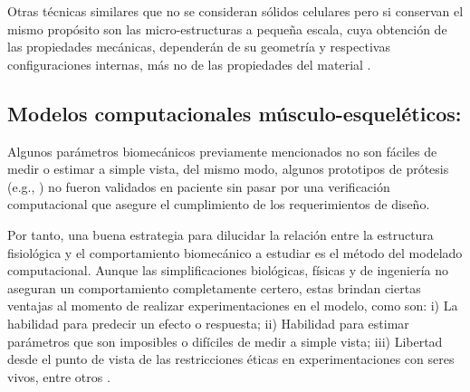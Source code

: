 \documentclass[12pt,english]{article}
\begin{document}
Otras técnicas similares que no se consideran sólidos celulares pero si conservan el mismo propósito son las micro-estructuras a pequeña escala, cuya obtención de las propiedades mecánicas, dependerán de
su geometría y respectivas configuraciones internas, más no de las
propiedades del material \cite{Schumacher2015}.


\subsection*{Modelos computacionales músculo-esqueléticos:}

Algunos parámetros biomecánicos previamente mencionados no son fáciles
de medir o estimar a simple vista, del mismo modo, algunos prototipos
de prótesis (e.g., \cite{Lapre2014}) no fueron validados en paciente
sin pasar por una verificación computacional que asegure el cumplimiento
de los requerimientos de diseño. 

Por tanto, una buena estrategia para dilucidar la relación entre la
estructura fisiológica y el comportamiento biomecánico a estudiar
es el método del modelado computacional. Aunque las simplificaciones
biológicas, físicas y de ingeniería no aseguran un comportamiento
completamente certero, estas brindan ciertas ventajas al momento de
realizar experimentaciones en el modelo, como son: i) La habilidad
para predecir un efecto o respuesta; ii) Habilidad para estimar parámetros
que son imposibles o difíciles de medir a simple vista; iii) Libertad
desde el punto de vista de las restricciones éticas en experimentaciones
con seres vivos, entre otros \cite{Talaty2014}.
\end{document}
